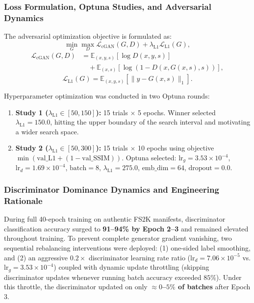 \documentclass[conference]{IEEEtran}
\begin{document}
\subsubsection{Loss Formulation, Optuna Studies, and Adversarial Dynamics}
The adversarial optimization objective is formulated as:
\begin{equation}
\min_G \max_D \mathcal{L}_{\text{cGAN}}(G, D) + \lambda_{\text{L1}} \mathcal{L}_{\text{L1}}(G),
\end{equation}
\begin{equation}
\begin{aligned}
\mathcal{L}_{\text{cGAN}}(G, D) &= \mathbb{E}_{(x, y, s)}\left[\log D(x, y, s)\right] \\
&\quad + \mathbb{E}_{(x, s)}\left[\log\left(1 - D(x, G(x, s), s)\right)\right],
\end{aligned}
\end{equation}
\begin{equation}
\mathcal{L}_{\text{L1}}(G) = \mathbb{E}_{(x, y, s)}\left[\|y - G(x, s)\|_1\right].
\end{equation}

Hyperparameter optimization was conducted in two Optuna rounds:
\begin{enumerate}
    \item \textbf{Study 1 ($\lambda_{\text{L1}} \in [50, 150]$):} 15 trials $\times$ 5 epochs. Winner selected $\lambda_{\text{L1}} = 150.0$, hitting the upper boundary of the search interval and motivating a wider search space.
    \item \textbf{Study 2 ($\lambda_{\text{L1}} \in [50, 300]$):} 15 trials $\times$ 10 epochs using objective $\min(\text{val\_L1} + (1 - \text{val\_SSIM}))$. Optuna selected: $\text{lr}_g = 3.53\times 10^{-4}$, $\text{lr}_d = 1.69\times 10^{-4}$, $\text{batch} = 8$, $\lambda_{\text{L1}} = 275.0$, $\text{emb\_dim} = 64$, $\text{dropout} = 0.0$.
\end{enumerate}

\subsubsection{Discriminator Dominance Dynamics and Engineering Rationale}
During full 40-epoch training on authentic FS2K manifests, discriminator classification accuracy surged to \textbf{91--94\% by Epoch 2--3} and remained elevated throughout training. To prevent complete generator gradient vanishing, two sequential rebalancing interventions were deployed: (1) one-sided label smoothing, and (2) an aggressive $0.2\times$ discriminator learning rate ratio ($\text{lr}_d = 7.06\times 10^{-5}$ vs. $\text{lr}_g = 3.53\times 10^{-4}$) coupled with dynamic update throttling (skipping discriminator updates whenever running batch accuracy exceeded $85\%$). Under this throttle, the discriminator updated on only \textbf{$\approx 0$--$5\%$ of batches} after Epoch 3.
\end{document}
